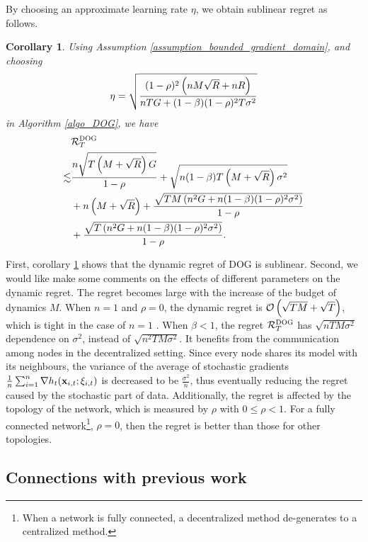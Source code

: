 \documentclass{article}
\newtheorem{Corollary}{\bf{Corollary}}
\begin{document}
By choosing an approximate learning rate $\eta$, we obtain sublinear regret as follows.
\begin{Corollary}
\label{corollary_regret_upper_bound}
Using Assumption \ref{assumption_bounded_gradient_domain}, and choosing 
\begin{align}
\nonumber
\eta = \sqrt{\frac{(1-\rho)^2 \left( nM\sqrt{R} + nR \right)}{ nTG + (1-\beta)(1-\rho)^2T\sigma^2 }}
\end{align} in Algorithm \ref{algo_DOG}, we have
\begin{align}
\nonumber
& {\mathcal{R}}_T^{\textsc{DOG}} \\ \nonumber
\lesssim & \frac{n \sqrt{T\left( M+\sqrt{R} \right)G} }{1-\rho} + \sqrt{n(1-\beta)T\left( M+\sqrt{R} \right)\sigma^2} \\ \nonumber
& + n\left( M+\sqrt{R} \right) + \frac{\sqrt{TM\left( n^2G + n(1-\beta)(1-\rho)^2\sigma^2 \right)}}{1-\rho} \\ \label{equa_result_corollary}
& + \frac{\sqrt{T\left( n^2G + n(1-\beta)(1-\rho)^2\sigma^2 \right)}}{1-\rho}.
\end{align}

\end{Corollary}


First, corollary \ref{corollary_regret_upper_bound} shows that the dynamic regret of DOG is sublinear. Second, we would like make some comments on the effects of different parameters on the dynamic regret. The regret becomes large with the increase of the budget of dynamics $M$. When $n=1$ and $\rho =0$, the dynamic regret is ${\mathcal{O}\left( \sqrt{TM}+\sqrt{T} \right)}$, which is tight in the case of $n=1$ \citep{Zhao:2018wx}. When $\beta<1$, the regret ${\mathcal{R}}_T^{\textsc{DOG}}$ has $\sqrt{nTM\sigma^2}$ dependence on $\sigma^2$, instead of $\sqrt{n^2TM\sigma^2}$. It benefits from the communication among nodes in the decentralized setting. Since every node shares its model with its neighbours, the variance of the average of stochastic gradients $\frac{1}{n}\sum_{i=1}^n\nabla h_t({\bf x}_{i,t};\xi_{i,t})$ is decreased to be $\frac{\sigma^2}{n}$, thus eventually reducing the regret caused by the stochastic part of data.   Additionally, the regret is affected by the topology of the network, which is measured by $\rho$ with $0\le \rho < 1$. For a fully connected network\footnote{When a network is fully connected, a decentralized method de-generates to a centralized method.}, $\rho = 0$, then the regret is better than those for other topologies. 




\subsection{Connections with previous work}
\end{document}

